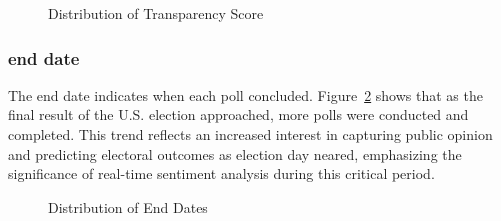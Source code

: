\documentclass[
  letterpaper,
  DIV=11,
  numbers=noendperiod]{scrartcl}
\begin{document}
\begin{figure}


\caption{\label{fig-transparency-score}Distribution of Transparency
Score}

\end{figure}%

\subsubsection{end date}\label{end-date}

The end date indicates when each poll concluded.
Figure~\ref{fig-end-date} shows that as the final result of the U.S.
election approached, more polls were conducted and completed. This trend
reflects an increased interest in capturing public opinion and
predicting electoral outcomes as election day neared, emphasizing the
significance of real-time sentiment analysis during this critical
period.

\begin{figure}


\caption{\label{fig-end-date}Distribution of End Dates}

\end{figure}%
\end{document}
